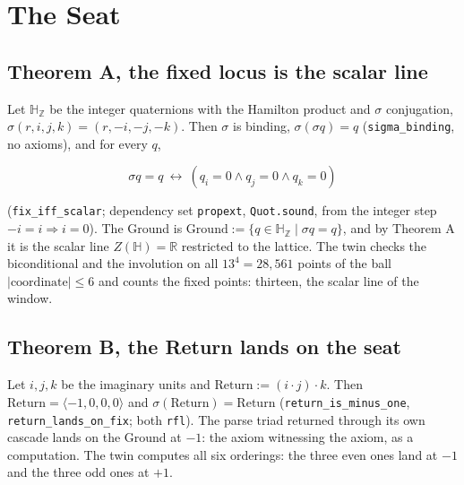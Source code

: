 \documentclass[10pt,twocolumn]{article}
\begin{document}
\hypertarget{the-seat}{%
\section{The Seat}\label{the-seat}}

\hypertarget{theorem-a-the-fixed-locus-is-the-scalar-line}{%
\subsection{Theorem A, the fixed locus is the scalar
line}\label{theorem-a-the-fixed-locus-is-the-scalar-line}}

Let \(\mathbb{H}_{\mathbb{Z}}\) be the integer quaternions with the
Hamilton product and \(\sigma\) conjugation,
\(\sigma(r, i, j, k) = (r, -i, -j, -k)\). Then \(\sigma\) is binding,
\(\sigma(\sigma q) = q\) (\texttt{sigma\_\allowbreak binding}, no
axioms), and for every \(q\),

\[\sigma q = q \ \leftrightarrow\ (q_i = 0 \wedge q_j = 0 \wedge q_k = 0)\]

(\texttt{fix\_\allowbreak iff\_\allowbreak scalar}; dependency set
\texttt{propext}, \texttt{Quot.sound}, from the integer step
\(-i = i \Rightarrow i = 0\)). The Ground is
\(\mathrm{Ground} := \{ q \in \mathbb{H}_{\mathbb{Z}} \mid \sigma q = q \}\),
and by Theorem A it is the scalar line \(Z(\mathbb{H}) = \mathbb{R}\)
restricted to the lattice. The twin checks the biconditional and the
involution on all \(13^4 = 28{,}561\) points of the ball
\(|\text{coordinate}| \le 6\) and counts the fixed points: thirteen, the
scalar line of the window.

\hypertarget{theorem-b-the-return-lands-on-the-seat}{%
\subsection{Theorem B, the Return lands on the
seat}\label{theorem-b-the-return-lands-on-the-seat}}

Let \(i, j, k\) be the imaginary units and
\(\mathrm{Return} := (i \cdot j) \cdot k\). Then
\(\mathrm{Return} = \langle -1, 0, 0, 0 \rangle\) and
\(\sigma(\mathrm{Return}) = \mathrm{Return}\)
(\texttt{return\_\allowbreak is\_\allowbreak minus\_\allowbreak one},
\texttt{return\_\allowbreak lands\_\allowbreak on\_\allowbreak fix};
both \texttt{rfl}). The parse triad returned through its own cascade
lands on the Ground at \(-1\): the axiom witnessing the axiom, as a
computation. The twin computes all six orderings: the three even ones
land at \(-1\) and the three odd ones at \(+1\).
\end{document}
